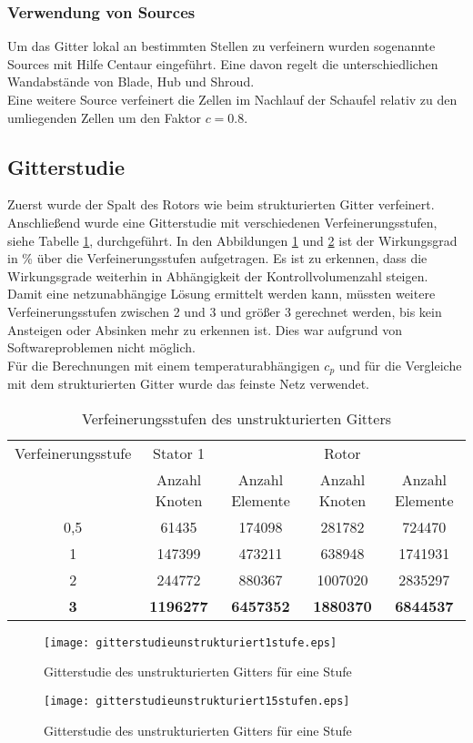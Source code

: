 \subsubsection{Verwendung von Sources}
Um das Gitter lokal an bestimmten Stellen zu verfeinern wurden  sogenannte Sources mit Hilfe Centaur eingeführt.
Eine davon regelt die unterschiedlichen Wandabstände von Blade, Hub und Shroud.\\
Eine weitere Source verfeinert die Zellen im Nachlauf der Schaufel relativ zu den umliegenden Zellen um den Faktor $c = 0.8$.

\subsection{Gitterstudie}
Zuerst wurde der Spalt des Rotors wie beim strukturierten Gitter verfeinert. Anschließend wurde eine Gitterstudie mit verschiedenen Verfeinerungsstufen, siehe Tabelle \ref{tab:verfeinerungenunstrukturiert}, durchgeführt. In den Abbildungen \ref{fig:gitterunstrukturiert1stufe} und \ref{fig:gitterunstrukturiert15stufen} ist der Wirkungsgrad in \% über die Verfeinerungsstufen aufgetragen. Es ist zu erkennen, dass die Wirkungsgrade weiterhin in Abhängigkeit der Kontrollvolumenzahl steigen. Damit eine netzunabhängige Lösung ermittelt werden kann, müssten weitere Verfeinerungsstufen zwischen 2 und 3 und größer 3 gerechnet werden, bis kein Ansteigen oder Absinken mehr zu erkennen ist. Dies war aufgrund von Softwareproblemen nicht möglich.\\
Für die Berechnungen mit einem temperaturabhängigen $c_p$ und für die Vergleiche mit dem strukturierten Gitter wurde das feinste Netz verwendet.
\begin{table}[h]
		\centering
		\caption{Verfeinerungsstufen des unstrukturierten Gitters}
	\begin{tabular}{ c| c | c| c| c}
Verfeinerungsstufe	&	Stator 1	&		&	Rotor	&		\\
&	Anzahl Knoten	&	Anzahl Elemente	&	Anzahl Knoten	&	Anzahl Elemente	\\
\hline									
0,5	&	61435	&	174098	&	281782	&	724470	\\
1	&	147399	&	473211	&	638948	&	1741931	\\
2	&	244772	&	880367	&	1007020	&	2835297	\\
\textbf{3}	&	\textbf{1196277}	&	\textbf{6457352}	&	\textbf{1880370}	&	\textbf{6844537}	\\

	\end{tabular}
		\label{tab:verfeinerungenunstrukturiert}
\end{table}
\begin{figure}[htbp]
	\centering
	\texttt{[image: gitterstudieunstrukturiert1stufe.eps]}
	\caption{Gitterstudie des unstrukturierten Gitters für eine Stufe} \label{fig:gitterunstrukturiert1stufe}
\end{figure}

\begin{figure}[htbp]
	\centering
	\texttt{[image: gitterstudieunstrukturiert15stufen.eps]}
	\caption{Gitterstudie des unstrukturierten Gitters für eine Stufe}
	\label{fig:gitterunstrukturiert15stufen}
\end{figure}